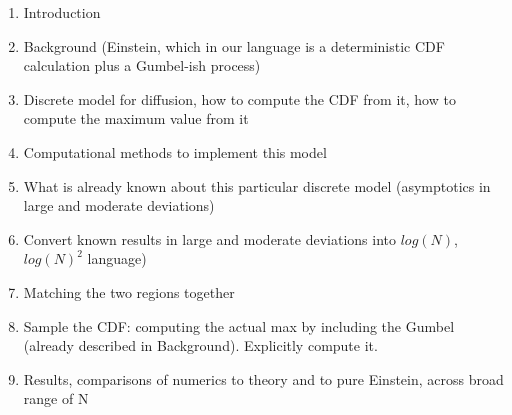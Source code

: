 \documentclass[%
 reprint,
 amsmath,amssymb,
 longbibliography,
 aps,
]{revtex4-1}
\begin{document}
\begin{enumerate}
    \item Introduction
    \item Background (Einstein, which in our language is a deterministic CDF calculation plus a Gumbel-ish process)
    \item Discrete model for diffusion, how to compute the CDF from it, how to compute the maximum value from it
    \item Computational methods to implement this model
    \item What is already known about this particular discrete model (asymptotics in large and moderate deviations)
    \item Convert known results in large and moderate deviations into $log(N)$, $log(N)^2$ language)
    \item Matching the two regions together
    \item Sample the CDF: computing the actual max by including the Gumbel (already described in Background).  Explicitly compute it.
    \item Results, comparisons of numerics to theory and to pure Einstein, across broad range of N
\end{enumerate}
\end{document}
